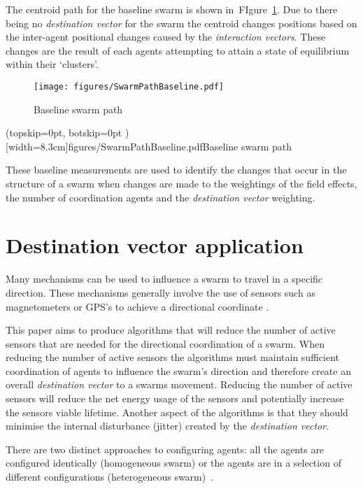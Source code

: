 \documentclass{ieeeaccess}
\begin{document}
The centroid path for the baseline swarm is shown in~FIgure~\ref{coord:SwarmPathBaseline1}. Due to there being no \textit{destination vector} for the swarm the centroid changes positions based on the inter-agent positional changes caused by the \textit{interaction vectors}. These changes are the result of each agents attempting to attain a state of equilibrium within their `clusters'.

\begin{figure}
\begin{center}
\texttt{[image: figures/SwarmPathBaseline.pdf]}
\end{center}
\caption{Baseline swarm path\label{coord:SwarmPathBaseline1}}
\end{figure}

\Figure[t!](topskip=0pt, botskip=0pt )[width=8.3cm]{figures/SwarmPathBaseline.pdf}{Baseline swarm path\label{coord:SwarmPathBaseline1}}

These baseline measurements are used to identify the changes that occur in the structure of a swarm when changes are made to the weightings of the field effects, the number of coordination agents and the \textit{destination vector} weighting.

\section{Destination vector application}
Many mechanisms can be used to influence a swarm to travel in a specific direction. These mechanisms generally involve the use of sensors such as magnetometers or GPS's to achieve a directional coordinate \cite{SG:15,TG:12}. 

This paper aims to produce algorithms that will reduce the number of active sensors that are needed for the directional coordination of a swarm. When reducing the number of active sensors the algorithms must maintain sufficient coordination of agents to influence the swarm's direction and therefore create an overall \textit{destination vector} to a swarms movement. Reducing the number of active sensors will reduce the net energy usage of the sensors and potentially increase the sensors viable lifetime. Another aspect of the algorithms is that they should minimise the internal disturbance (jitter) created by the \textit{destination vector}.

There are two distinct approaches to configuring agents: all the agents are configured identically (homogeneous swarm) or the agents are in a selection of different configurations (heterogeneous swarm)~\cite{BS:13}. 
\end{document}
